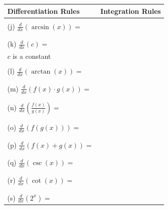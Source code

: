 \documentclass[11pt,fleqn]{article}
\begin{document}
 \newpage
 
\begin{tabularx}{\textwidth}{l || l} 
Differentiation Rules & Integration Rules\\ \hline \hline & \\
\hspace*{-.3in}(j) \: $\displaystyle{ \frac{d}{dx}\left(\arcsin(x)\right)=}$ \hspace{2.5in} \quad & \\ &\\ \hline & \\
\hspace*{-.3in}(k) \:  $\displaystyle{\frac{d}{dx}\left(c\right)=}$& \\ 
 $c$ is a constant\\  \hline & \\
\hspace*{-.3in}(l) \:  $\displaystyle{\frac{d}{dx}\left(\arctan(x)\right)=}$ &\\ &\\ \hline & \\
\hspace*{-.3in}(m) \:  $\displaystyle{ \frac{d}{dx}\left(f(x)\cdot g(x)\right)=}$ &\\ &\\ \hline & \\ 
\hspace*{-.3in}(n) \:  $\displaystyle{ \frac{d}{dx}\left(\frac{f(x)}{g(x)}\right)=}$ &\\ &\\ \hline & \\
\hspace*{-.3in}(o) \:  $\displaystyle{\frac{d}{dx}\left(f(g(x))\right)=}$ &\\  &\\ \hline & \\
\hspace*{-.3in}(p) \:  $\displaystyle{ \frac{d}{dx}\left({f(x)}+{g(x)}\right)=}$&\\ &\\ \hline & \\
\hspace*{-.3in}(q) \: $\displaystyle{\frac{d}{dx}\left(\csc(x)\right)=}$ &\\ &\\ \hline & \\
\hspace*{-.3in}(r) \:  $\displaystyle{ \frac{d}{dx}\left(\cot(x) \right)=}$ &\\ &\\ \hline & \\
\hspace*{-.3in}(s) \:  $\displaystyle{ \frac{d}{dx}\left(2^x \right)=}$ &\\ 
 \end{tabularx}
 
 
\end{document}
